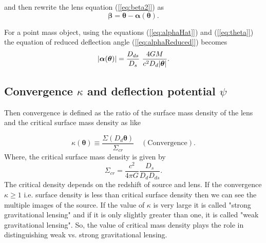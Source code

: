   and then rewrite the lens equation (\ref{[eq:beta2]}) as
  \begin{equation}\label{[eq:beta3]}
     \boldsymbol{\beta} = \boldsymbol{\theta} - \boldsymbol{\alpha} (\boldsymbol{\theta} ).
  \end{equation}

  For a point mass object, using the equations (\ref{[eq:alphaHat]}) and (\ref{[eq:theta]}) the equation of reduced deflection angle (\ref{[eq:alphaReduced]})
  becomes
  \begin{equation}\label{[eq:alphaAbs]}
    \lvert\boldsymbol{\alpha} (\boldsymbol{\theta} )\rvert = \frac{D_{ds}}{D_s}\  \frac{4GM}{c^2 D_d \lvert\boldsymbol{\theta}  \rvert}.
  \end{equation}


%
%
\subsection{Convergence \texorpdfstring{$\kappa$ and deflection potential $\psi$}{kappaDefletionPotential}}
  Then convergence is defined as the ratio of the surface mass density of the lens
  and the critical surface mass density as like

  \begin{equation}\label{[eq:kappa]}
    \boxed{\kappa (\boldsymbol{\theta} ) \equiv \frac{\Sigma (D_d \boldsymbol{\theta} )}{\Sigma_{cr}}} \quad (\text{Convergence}).
   \end{equation}
  Where, the critical surface mass density is given by
  \begin{equation}\label{[eq:crit_surf_mass_density]}
    \Sigma_{cr} = \frac{c^2}{4\pi G} \frac{D_s}{D_d D_{ds}}.
  \end{equation}
  The critical density depends on the redshift of source and lens.
  If the convergence $\kappa \geq 1$ i.e. surface density is less than critical
  surface density then we can see the multiple images of the source. If the
  value of $\kappa$ is very large it is called "strong gravitational lensing"
  and if it is only slightly greater than one, it is called "weak gravitational lensing".
  So, the value of critical mass density plays the role in distinguishing weak
  vs. strong gravitational lensing.

